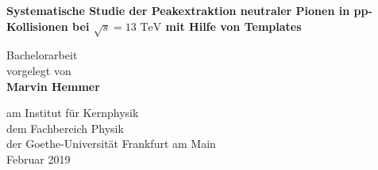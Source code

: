 \vspace*{1cm}

\huge
\textbf{Systematische Studie der Peakextraktion neutraler Pionen in pp-Kollisionen bei $\sqrt{s}=13\text{ TeV}$ mit Hilfe von Templates}

 
\vspace{3.5cm}
\LARGE
Bachelorarbeit\\
vorgelegt von\\
\textbf{Marvin Hemmer}

\vfill
 
\Large
am Institut f\"ur Kernphysik\\
dem Fachbereich Physik\\
der Goethe-Universit\"at Frankfurt am Main\\
Februar 2019
 